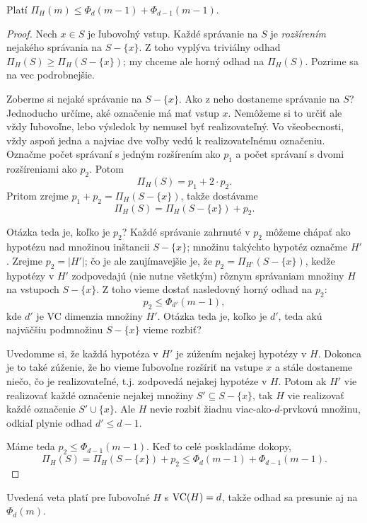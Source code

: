 \begin{theorem}
  Platí $\Pi_H(m) \leq \Phi_d(m-1) + \Phi_{d-1}(m-1)$.
\end{theorem}
\begin{proof}
  Nech $x \in S$ je ľubovoľný vstup. Každé správanie na $S$ je \emph{rozšírením}
  nejakého správania na $S - \{x\}$. Z toho vyplýva triviálny odhad
  $\Pi_H(S) \geq \Pi_H(S - \{x\})$; my chceme ale horný odhad na $\Pi_H(S)$.
  Pozrime sa na vec podrobnejšie.
  
  Zoberme si nejaké správanie na $S - \{x\}$. Ako z neho dostaneme
  správanie na $S$? Jednoducho určíme, aké označenie má mať vstup $x$.
  Nemôžeme si to určiť ale vždy ľubovoľne, lebo výsledok by nemusel
  byť realizovateľný. Vo všeobecnosti, vždy aspoň jedna a najviac dve
  voľby vedú k realizovateľnému označeniu. Označme počet správaní
  s jedným rozšírením ako $p_1$ a počet správaní s dvomi rozšíreniami
  ako $p_2$. Potom
  $$ \Pi_H(S) = p_1 + 2 \cdot p_2. $$
  Pritom zrejme $p_1 + p_2 = \Pi_H(S - \{x\})$, takže dostávame
  $$ \Pi_H(S) = \Pi_H(S - \{x\}) + p_2. $$
  
  Otázka teda je, koľko je $p_2$? Každé správanie zahrnuté v $p_2$ 
  môžeme chápať ako hypotézu nad množinou inštancii $S - \{x\}$; 
  množinu takýchto hypotéz označme $H'$. Zrejme $p_2 = |H'|$; čo je ale 
  zaujímavejšie je, že $p_2 = \Pi_{H'}(S - \{x\})$, kedže hypotézy v 
  $H'$ zodpovedajú (nie nutne všetkým) rôznym správaniam množiny $H$
  na vstupoch $S - \{x\}$. Z toho vieme dostať nasledovný horný odhad
  na $p_2$:
  $$ p_2 \leq \Phi_{d'}(m - 1), $$
  kde $d'$ je VC dimenzia množiny $H'$. Otázka teda je, koľko je $d'$,
  teda akú najväčšiu podmnožinu $S - \{x\}$ vieme rozbiť?
  
  Uvedomme si, že každá hypotéza v $H'$ je zúžením nejakej hypotézy
  v $H$. Dokonca je to také zúženie, že ho vieme ľubovoľne rozšíriť
  na vstupe $x$ a stále dostaneme niečo, čo je realizovateľné, t.j.
  zodpovedá nejakej hypotéze v $H$. Potom ak $H'$ vie realizovať
  každé označenie nejakej množiny $S' \subseteq S - \{x\}$, tak $H$
  vie realizovať každé označenie $S' \cup \{x\}$. Ale $H$ nevie
  rozbiť žiadnu viac-ako-$d$-prvkovú množinu, odkiaľ plynie
  odhad $d' \leq d - 1$.
  
  Máme teda $p_2 \leq \Phi_{d-1}(m - 1)$. Keď to celé poskladáme dokopy,
  $$ \Pi_H(S) = \Pi_H(S - \{x\}) + p_2 \leq \Phi_d(m - 1) + \Phi_{d-1}(m - 1). $$
\end{proof}

Uvedená veta platí pre ľubovoľné $H$ s $\mathrm{VC}(H) = d$, takže odhad sa
presunie aj na $\Phi_d(m)$.

